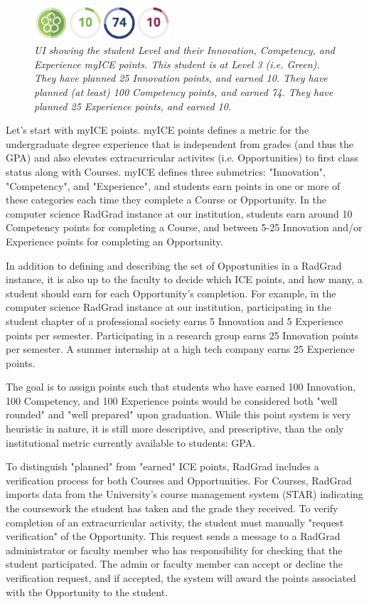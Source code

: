 \documentclass[acmsmall]{acmart}
\begin{document}
\begin{figure}[t]
\centering
\includegraphics[width=2in]{ice-pane.eps}
\caption{\em UI showing the student Level and their Innovation, Competency, and Experience myICE points. This student is at Level 3 (i.e. Green). They have planned 25 Innovation points, and earned 10. They have planned (at least) 100 Competency points, and earned 74. They have planned 25 Experience points, and earned 10.  }
\label{fig:ice}
\end{figure}

Let's start with myICE points.  myICE points defines a metric for the undergraduate degree experience that is independent from grades (and thus the GPA) and also elevates extracurricular activites (i.e. Opportunities) to first class status along with Courses. myICE defines three submetrics: "Innovation", "Competency", and "Experience", and students earn points in one or more of these categories each time they complete a Course or Opportunity. In the computer science RadGrad instance at our institution, students earn around 10 Competency points for completing a Course, and between 5-25 Innovation and/or Experience points for completing an Opportunity.

In addition to defining and describing the set of Opportunities in a RadGrad instance, it is also up to the faculty to decide which ICE points, and how many, a student should earn for each Opportunity's completion. For example, in the computer science RadGrad instance at our institution, participating in the student chapter of a professional society earns 5 Innovation and 5 Experience points per semester.  Participating in a research group earns 25 Innovation points per semester.  A summer internship at a high tech company earns 25 Experience points.

The goal is to assign points such that students who have earned 100 Innovation, 100 Competency, and 100 Experience points would be considered both "well rounded" and "well prepared" upon graduation.  While this point system is very heuristic in nature, it is still more descriptive, and prescriptive, than the only institutional metric currently available to students: GPA.

To distinguish "planned" from "earned" ICE points, RadGrad includes a verification process for both Courses and Opportunities. For Courses, RadGrad imports data from the University's course management system (STAR) indicating the coursework the student has taken and the grade they received.  To verify completion of an extracurricular activity, the student must manually "request verification" of the Opportunity.  This request sends a message to a RadGrad administrator or faculty member who has responsibility for checking that the student participated. The admin or faculty member can accept or decline the verification request, and if accepted, the system will award the points associated with the Opportunity to the student.
\end{document}
